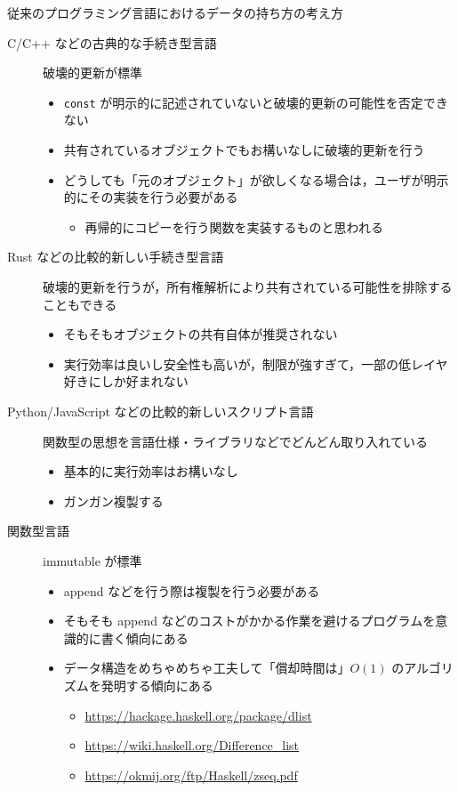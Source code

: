 \documentclass[10pt, a4j, twocolumn]{scrartcl}
\begin{document}
従来のプログラミング言語におけるデータの持ち方の考え方
\begin{description}
\item[{C/C++ などの古典的な手続き型言語}] 破壊的更新が標準
\begin{itemize}
\item \texttt{const} が明示的に記述されていないと破壊的更新の可能性を否定できない
\item 共有されているオブジェクトでもお構いなしに破壊的更新を行う
\item どうしても「元のオブジェクト」が欲しくなる場合は，ユーザが明示的にその実装を行う必要がある
\begin{itemize}
\item 再帰的にコピーを行う関数を実装するものと思われる
\end{itemize}
\end{itemize}
\item[{Rust などの比較的新しい手続き型言語}] 破壊的更新を行うが，所有権解析により共有されている可能性を排除することもできる
\begin{itemize}
\item そもそもオブジェクトの共有自体が推奨されない
\item 実行効率は良いし安全性も高いが，制限が強すぎて，一部の低レイヤ好きにしか好まれない
\end{itemize}
\item[{Python/JavaScript などの比較的新しいスクリプト言語}] 関数型の思想を言語仕様・ライブラリなどでどんどん取り入れている
\begin{itemize}
\item 基本的に実行効率はお構いなし
\item ガンガン複製する
\end{itemize}
\item[{関数型言語}] immutable が標準
\begin{itemize}
\item append などを行う際は複製を行う必要がある
\item そもそも append などのコストがかかる作業を避けるプログラムを意識的に書く傾向にある
\item データ構造をめちゃめちゃ工夫して「償却時間は」\(O(1)\) のアルゴリズムを発明する傾向にある
\begin{itemize}
\item \url{https://hackage.haskell.org/package/dlist}
\item \url{https://wiki.haskell.org/Difference\_list}
\item \url{https://okmij.org/ftp/Haskell/zseq.pdf}

\end{itemize}
\end{itemize}
\end{description}
\end{document}
